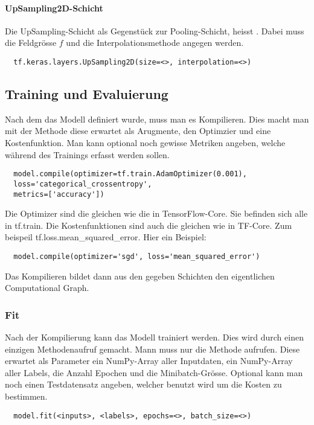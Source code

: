 \paragraph{UpSampling2D-Schicht}
Die UpSampling-Schicht als Gegenstück zur Pooling-Schicht, heisst
. Dabei muss die Feldgrösse $f$ und die
Interpolationsmethode angegen werden.

\begin{verbatim}
  tf.keras.layers.UpSampling2D(size=<>, interpolation=<>)
\end{verbatim}

\subsection{Training und Evaluierung}

Nach dem das Modell definiert wurde, muss man es Kompilieren.
Dies macht man mit der Methode  diese erwartet als
Arugmente, den Optimzier und eine Kostenfunktion. Man kann optional noch gewisse
Metriken angeben, welche während des Trainings erfasst werden sollen.
\begin{verbatim}
  model.compile(optimizer=tf.train.AdamOptimizer(0.001),
  loss='categorical_crossentropy',
  metrics=['accuracy'])
\end{verbatim}
Die Optimizer sind die gleichen wie die in TensorFlow-Core. Sie befinden sich
alle in tf.train. Die Kostenfunktionen sind auch die gleichen wie in TF-Core.
Zum beispeil tf.loss.mean\_squared\_error.
\para{}
Hier ein Beispiel:
\begin{verbatim}
  model.compile(optimizer='sgd', loss='mean_squared_error')
\end{verbatim}
Das Kompilieren bildet dann aus den gegeben Schichten den eigentlichen
Computational Graph.

\subsubsection{Fit}
Nach der Kompilierung kann das Modell trainiert werden. Dies wird durch einen
einzigen Methodenaufruf gemacht. Mann muss nur die  Methode aufrufen.
Diese erwartet als Parameter ein NumPy-Array aller Inputdaten, ein NumPy-Array
aller Labels, die Anzahl Epochen und die Minibatch-Grösse.
Optional kann man noch einen Testdatensatz angeben, welcher benutzt wird um die
Kosten zu bestimmen.
\begin{verbatim}
  model.fit(<inputs>, <labels>, epochs=<>, batch_size=<>)
\end{verbatim}

